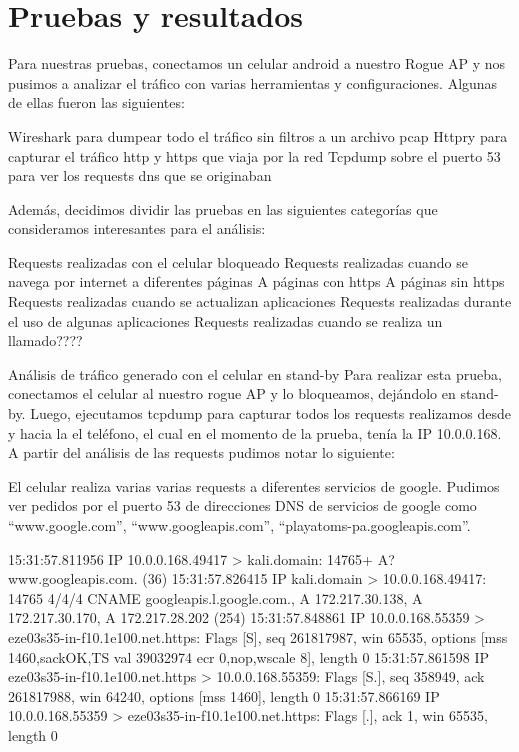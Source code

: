 \section{Pruebas y resultados}

Para nuestras pruebas, conectamos un celular android a nuestro Rogue AP y nos pusimos a analizar el tráfico con varias herramientas y configuraciones. Algunas de ellas fueron las siguientes:

Wireshark para dumpear todo el tráfico sin filtros a un archivo pcap
Httpry para capturar el tráfico http y https que viaja por la red
Tcpdump sobre el puerto 53 para ver los requests dns que se originaban

Además, decidimos dividir las pruebas en las siguientes categorías que consideramos interesantes para el análisis:

Requests realizadas con el celular bloqueado
Requests realizadas cuando se navega por internet a diferentes páginas
A páginas con https
A páginas sin https
Requests realizadas cuando se actualizan aplicaciones
Requests realizadas durante el uso de algunas aplicaciones
Requests realizadas cuando se realiza un llamado????


Análisis de tráfico generado con el celular en stand-by
Para realizar esta prueba, conectamos el celular al nuestro rogue AP y lo bloqueamos, dejándolo en stand-by. Luego, ejecutamos tcpdump para capturar todos los requests realizamos desde y hacia la el teléfono, el cual en el momento de la prueba, tenía la IP 10.0.0.168. A partir del análisis de las requests pudimos notar lo siguiente:

El celular realiza varias varias requests a diferentes servicios de google. Pudimos ver pedidos por el puerto 53 de direcciones DNS de servicios de google como “www.google.com”, “www.googleapis.com”, “playatoms-pa.googleapis.com”.
	
15:31:57.811956 IP 10.0.0.168.49417 > kali.domain: 14765+ A? www.googleapis.com. (36)
15:31:57.826415 IP kali.domain > 10.0.0.168.49417: 14765 4/4/4 CNAME googleapis.l.google.com., A 172.217.30.138, A 172.217.30.170, A 172.217.28.202 (254)
15:31:57.848861 IP 10.0.0.168.55359 > eze03s35-in-f10.1e100.net.https: Flags [S], seq 261817987, win 65535, options [mss 1460,sackOK,TS val 39032974 ecr 0,nop,wscale 8], length 0
15:31:57.861598 IP eze03s35-in-f10.1e100.net.https > 10.0.0.168.55359: Flags [S.], seq 358949, ack 261817988, win 64240, options [mss 1460], length 0
15:31:57.866169 IP 10.0.0.168.55359 > eze03s35-in-f10.1e100.net.https: Flags [.], ack 1, win 65535, length 0

